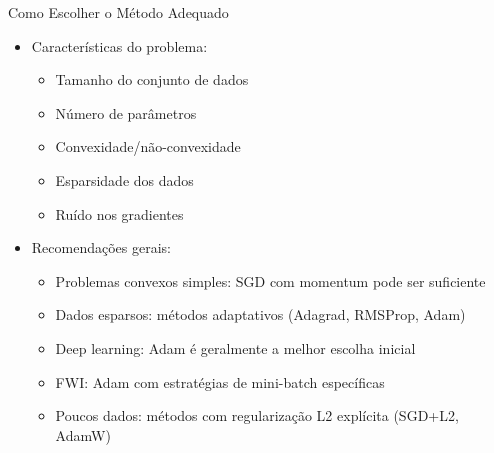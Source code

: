 \documentclass[aspectratio=1610]{beamer}
\begin{document}
\begin{frame}{Como Escolher o Método Adequado}
\begin{itemize}
    \item Características do problema: \pause
    \begin{itemize}
        \item Tamanho do conjunto de dados \pause
        \item Número de parâmetros \pause
        \item Convexidade/não-convexidade \pause
        \item Esparsidade dos dados \pause
        \item Ruído nos gradientes
    \end{itemize} \pause
    \item Recomendações gerais: \pause
    \begin{itemize}
        \item Problemas convexos simples: SGD com momentum pode ser suficiente \pause
        \item Dados esparsos: métodos adaptativos (Adagrad, RMSProp, Adam) \pause
        \item Deep learning: Adam é geralmente a melhor escolha inicial \pause
        \item FWI: Adam com estratégias de mini-batch específicas \pause
        \item Poucos dados: métodos com regularização L2 explícita (SGD+L2, AdamW)
    \end{itemize}
\end{itemize}
\end{frame}
\end{document}
